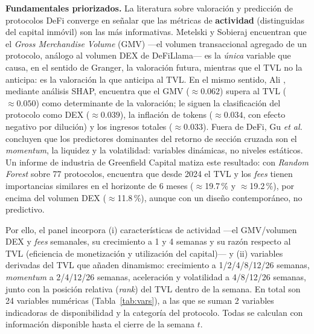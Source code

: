 \documentclass[letterpaper,journal]{IEEEtran}
\begin{document}
\textbf{Fundamentales priorizados.} La literatura sobre valoración y predicción
de protocolos DeFi converge en señalar que las métricas de \textbf{actividad}
(distinguidas del capital inmóvil) son las más informativas. Metelski y Sobieraj
\cite{metelski2022} encuentran que el \emph{Gross Merchandise Volume} (GMV) ---el
volumen transaccional agregado de un protocolo, análogo al volumen DEX de
DeFiLlama--- es la \emph{única} variable que causa, en el sentido de Granger, la
valoración futura, mientras que el TVL no la anticipa: es la valoración la que
anticipa al TVL. En el mismo sentido, Ali \cite{ali2026}, mediante análisis SHAP,
encuentra que el GMV ($\approx 0.062$) supera al TVL ($\approx 0.050$) como
determinante de la valoración; le siguen la clasificación del protocolo como DEX
($\approx 0.039$), la inflación de tokens ($\approx 0.034$, con efecto negativo
por dilución) y los ingresos totales ($\approx 0.033$). Fuera de DeFi, Gu
\emph{et al.} \cite{gukellyxiu2020} concluyen que los predictores dominantes del
retorno de sección cruzada son el \emph{momentum}, la liquidez y la volatilidad:
variables dinámicas, no niveles estáticos. Un informe de industria de Greenfield
Capital \cite{greenfield2025} matiza este resultado: con \emph{Random Forest}
sobre 77 protocolos, encuentra que desde 2024 el TVL y los \emph{fees} tienen
importancias similares en el horizonte de 6 meses ($\approx$19.7\,\% y
$\approx$19.2\,\%), por encima del volumen DEX ($\approx$11.8\,\%), aunque con
un diseño contemporáneo, no predictivo.

Por ello, el panel incorpora (i) características de actividad ---el GMV/volumen
DEX y \emph{fees} semanales, su crecimiento a 1 y 4 semanas y su razón respecto
al TVL (eficiencia de monetización y utilización del capital)--- y (ii) variables
derivadas del TVL que añaden dinamismo: crecimiento a 1/2/4/8/12/26 semanas,
\emph{momentum} a 2/4/12/26 semanas, aceleración y volatilidad a 4/8/12/26
semanas, junto con la posición relativa (\emph{rank}) del TVL dentro de la semana.
En total son 24 variables numéricas (Tabla~\ref{tab:vars}), a las que se suman
2 variables indicadoras de disponibilidad y la categoría del protocolo. Todas se
calculan con información disponible hasta el cierre de la semana $t$.
\end{document}
